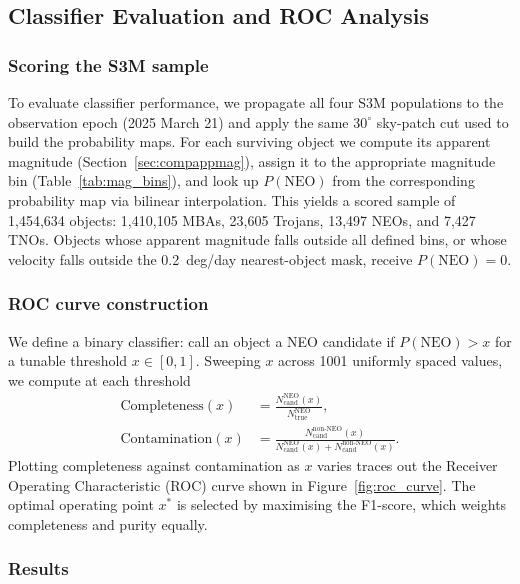 \documentclass[linenumbers,trackchanges,twocolumn]{aastex701}
\begin{document}
\subsection{Classifier Evaluation and ROC Analysis}
\label{sec:ROC}

\subsubsection*{Scoring the S3M sample}

To evaluate classifier performance, we propagate all four S3M populations to the observation epoch (2025 March 21) and apply the same $30^\circ$ sky-patch cut used to build the probability maps.
For each surviving object we compute its apparent magnitude (Section~\ref{sec:compappmag}), assign it to the appropriate magnitude bin (Table~\ref{tab:mag_bins}), and look up $P(\mathrm{NEO})$ from the corresponding probability map via bilinear interpolation.
This yields a scored sample of 1,454,634 objects: 1,410,105 MBAs, 23,605 Trojans, 13,497 NEOs, and 7,427 TNOs.
Objects whose apparent magnitude falls outside all defined bins, or whose velocity falls outside the 0.2~deg/day nearest-object mask, receive $P(\mathrm{NEO}) = 0$.

\subsubsection*{ROC curve construction}

We define a binary classifier: call an object a NEO candidate if $P(\mathrm{NEO}) > x$ for a tunable threshold $x \in [0, 1]$.
Sweeping $x$ across 1001 uniformly spaced values, we compute at each threshold
\begin{align}
  \text{Completeness}(x) &= \frac{N_\mathrm{cand}^\mathrm{NEO}(x)}{N_\mathrm{true}^\mathrm{NEO}}, \\
  \text{Contamination}(x) &= \frac{N_\mathrm{cand}^\mathrm{non\text{-}NEO}(x)}
                                   {N_\mathrm{cand}^\mathrm{NEO}(x) + N_\mathrm{cand}^\mathrm{non\text{-}NEO}(x)}.
\end{align}
Plotting completeness against contamination as $x$ varies traces out the Receiver Operating Characteristic (ROC) curve shown in Figure~\ref{fig:roc_curve}.
The optimal operating point $x^*$ is selected by maximising the F1-score, which weights completeness and purity equally.

\subsubsection*{Results}
\end{document}
